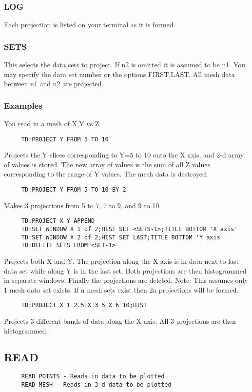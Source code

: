 \subsubsection{LOG}
Each projection is listed on your terminal as it is formed.  
\subsubsection{SETS}
This  selects the data sets to project.  If n2 is omitted it is assumed
to be n1.   You  may  specify  the  data  set  number  or  the  options
FIRST,LAST.  All mesh data between n1 and n2 are projected.  
\subsubsection{Examples}
You read in a mesh of X,Y vs Z.  
\begin{verbatim}
     TD:PROJECT Y FROM 5 TO 10 
\end{verbatim}
Projects  the  Y slices corresponding to Y=5 to 10 onto the X axis, and
2-d array of values is stored.  The new array of values is the  sum  of
all  Z values corresponding to the range of Y values.  The mesh data is
destroyed.  
\begin{verbatim}
     TD:PROJECT Y FROM 5 TO 10 BY 2 
\end{verbatim}
Makes 3 projections from 5 to 7, 7 to 9, and 9 to 10 

\begin{verbatim}
     TD:PROJECT X Y APPEND 
     TD:SET WINDOW X 1 of 2;HIST SET <SETS-1>;TITLE BOTTOM 'X axis' 
     TD:SET WINDOW X 2 of 2;HIST SET LAST;TITLE BOTTOM 'Y axis' 
     TD:DELETE SETS FROM <SET-1> 
\end{verbatim}
Projects both X and Y.  The projection along the X axis is in data next
to last data set while along Y is in the last  set.   Both  projections
are then histogrammed in separate windows.  Finally the projections are
deleted.  
Note:   This assumes only 1 mesh data set exists.  If n mesh sets exist
then 2n projections will be formed.  

\begin{verbatim}
     TD:PROJECT X 1 2.5 X 3 5 X 6 10;HIST 
\end{verbatim}
Projects 3 different bands of data along the X axis.  All 3 projections
are then histogrammed.  
\subsection{READ}
\begin{verbatim}
     READ POINTS - Reads in data to be plotted 
     READ MESH - Reads in 3-d data to be plotted 
\end{verbatim}
